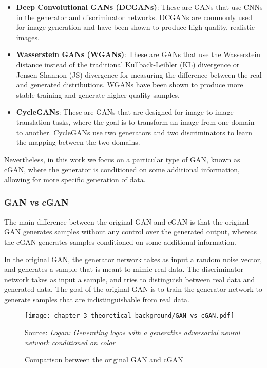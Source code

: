 \begin{itemize}
	\item \textbf{Deep Convolutional GANs (DCGANs)}: These are \acp{GAN} that use \acp{CNN} in the generator and discriminator networks. DCGANs are commonly used for image generation and have been shown to produce high-quality, realistic images.
	\item \textbf{Wasserstein GANs (WGANs)}: These are \acp{GAN} that use the Wasserstein distance instead of the traditional Kullback-Leibler (KL) divergence or Jensen-Shannon (JS) divergence for measuring the difference between the real and generated distributions. WGANs have been shown to produce more stable training and generate higher-quality samples.
	\item \textbf{CycleGANs}: These are \acp{GAN} that are designed for image-to-image translation tasks, where the goal is to transform an image from one domain to another. CycleGANs use two generators and two discriminators to learn the mapping between the two domains.
\end{itemize}

Nevertheless, in this work we focus on a particular type of \ac{GAN}, known as \acf{cGAN}, where the generator is conditioned on some additional information, allowing for more specific generation of data. 

\subsubsection{GAN vs cGAN}
\label{subsubsec:3_cGAN}

The main difference between the original \acf{GAN} and \acf{cGAN} is that the original \ac{GAN} generates samples without any control over the generated output, whereas the \ac{cGAN} generates samples conditioned on some additional information.

In the original \ac{GAN}, the generator network takes as input a random noise vector, and generates a sample that is meant to mimic real data. The discriminator network takes as input a sample, and tries to distinguish between real data and generated data. The goal of the original \ac{GAN} is to train the generator network to generate samples that are indistinguishable from real data.

\begin{figure}[h]
	\centering
	\texttt{[image: chapter\_3\_theoretical\_background/GAN\_vs\_cGAN.pdf]}
	\caption{Comparison between the original GAN and cGAN}
	Source: \textit{Logan: Generating logos with a generative adversarial neural network conditioned on color} \cite{mino2018logan}
	\label{fig:chapter_3_theoretical_background/GAN_vs_cGAN}
\end{figure}

